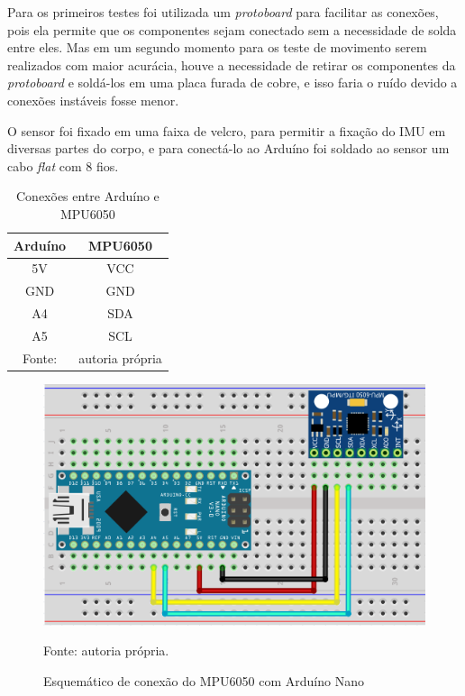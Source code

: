 		Para os primeiros testes foi utilizada um \textit{protoboard} para facilitar as conexões, pois ela permite que os componentes sejam conectado sem a necessidade de solda entre eles. Mas em um segundo momento para os teste de movimento serem realizados com maior acurácia, houve a necessidade de retirar os componentes da \textit{protoboard} e soldá-los em uma placa furada de cobre, e isso faria o ruído devido a conexões instáveis fosse menor.
		
		O sensor foi fixado em uma faixa de velcro, para permitir a fixação do IMU em diversas partes do corpo, e para conectá-lo ao Arduíno foi soldado ao sensor um cabo \textit{flat} com 8 fios.
		
		\begin{table}[h] \footnotesize
			\centering
			\caption{Conexões entre Arduíno e MPU6050}
			\label{conexoes_arduino}
			
			\begin{tabular}{cc}
				\toprule
				\textbf{Arduíno} & \textbf{MPU6050} \\
				\midrule
				5V & VCC \\
				GND & GND \\
				A4 & SDA \\
				A5 & SCL \\
				\bottomrule
				Fonte: & autoria própria
			\end{tabular}
		\end{table}
		
		\begin{figure}[h]
			\centering
			\includegraphics[keepaspectratio=true,scale=0.5]{figuras/conexoes_mpu_arduino.PNG}
			\caption{ Esquemático de conexão do MPU6050 com Arduíno Nano }
			Fonte: autoria própria. \footnotesize
			\label{conexoes}	
		\end{figure}
		

